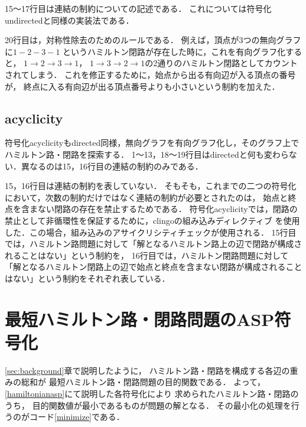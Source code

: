 15〜17行目は連結の制約についての記述である．
これについては符号化undirectedと同様の実装法である．

20行目は，対称性除去のためのルールである．
例えば，頂点が3つの無向グラフに$1 - 2 - 3 - 1$
というハミルトン閉路が存在した時に，これを有向グラフ化すると，
$1 \rightarrow 2 \rightarrow 3 \rightarrow 1$，
$1 \rightarrow 3 \rightarrow 2 \rightarrow 1$の2通りのハミルトン閉路としてカウントされてしまう．
これを修正するために，始点から出る有向辺が入る頂点の番号が，
終点に入る有向辺が出る頂点番号よりも小さいという制約を加えた．
\newpage
\subsection{acyclicity}

符号化acyclicityもdirected同様，無向グラフを有向グラフ化し，そのグラフ上でハミルトン路・閉路を探索する．
1〜13，18〜19行目はdirectedと何も変わらない．異なるのは15，16行目の連結の制約のみである．

15，16行目は連結の制約を表していない．
そもそも，これまでの二つの符号化において，次数の制約だけではなく連結の制約が必要とされたのは，
始点と終点を含まない閉路の存在を禁止するためである．
符号化acyclicityでは，閉路の禁止として非循環性を保証するために，clingoの組み込みディレクティブ\cite{gebser2016}
を使用した．この場合，組み込みのアサイクリシティチェック\cite{bomanson2016}が使用される．\cite{dimopoulos2018}
15行目では，ハミルトン路問題に対して「解となるハミルトン路上の辺で閉路が構成されることはない」という制約を，
16行目では，ハミルトン閉路問題に対して「解となるハミルトン閉路上の辺で始点と終点を含まない閉路が構成されることはない」という制約をそれぞれ表している．
\section{最短ハミルトン路・閉路問題のASP符号化}\label{minexpl}

\ref{sec:background}章で説明したように，
ハミルトン路・閉路を構成する各辺の重みの総和が
最短ハミルトン路・閉路問題の目的関数である．
よって，\ref{hamiltonianasp}にて説明した各符号化により
求められたハミルトン路・閉路のうち，
目的関数値が最小であるものが問題の解となる．
その最小化の処理を行うのがコード\ref{minimize}である．


